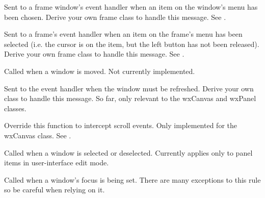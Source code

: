 \label{wxevthandleronmenucommand}


Sent to a frame window's event handler when an item on the window's menu has been chosen.
Derive your own frame class to handle this message. See .

\label{wxevthandleronmenuselect}


Sent to a frame's event handler when an item on the frame's menu has been selected
(i.e. the cursor is on the item, but the left button has not been
released). Derive your own frame class to handle this message.
See .



Called when a window is moved. Not currently implemented.



Sent to the event handler when the window must be refreshed.
Derive your own class to handle this message. So far, only
relevant to the wxCanvas and wxPanel classes.



Override this function to intercept scroll events. Only implemented
for the wxCanvas class. See .



Called when a window is selected or deselected. Currently applies only to panel items
in user-interface edit mode.



Called when a window's focus is being set. There are many exceptions to this rule
so be careful when relying on it.


